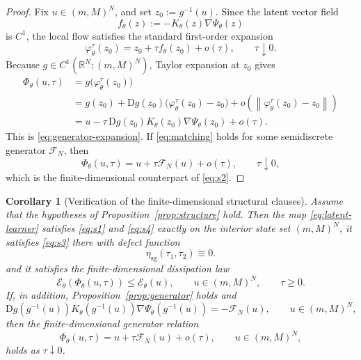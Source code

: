 \documentclass[11pt]{article}
\newtheorem{corollary}{Corollary}
\newcommand{\R}{\mathbb{R}}
\newcommand{\cE}{\mathcal{E}}
\newcommand{\cFN}{\mathcal{F}_N}
\newcommand{\PhiT}{\Phi_{\theta}}
\newcommand{\norm}[1]{\left\lVert #1 \right\rVert}
\begin{document}
\begin{proof}
Fix \(u\in (m,M)^N\), and set \(z_0:=g^{-1}(u)\). Since the latent vector field
\begin{equation*}
f_{\theta}(z):=-K_{\theta}(z)\nabla \Psi_{\theta}(z)
\end{equation*}
is \(C^1\), the local flow satisfies the standard first-order expansion
\begin{equation*}
\varphi_{\theta}^{\tau}(z_0)=z_0+\tau f_{\theta}(z_0)+o(\tau), \qquad \tau\downarrow 0.
\end{equation*}
Because \(g\in C^1(\R^N;(m,M)^N)\), Taylor expansion at \(z_0\) gives
\begin{align*}
\PhiT(u,\tau)
&=g\bigl(\varphi_{\theta}^{\tau}(z_0)\bigr) \\
&=g(z_0)+\mathrm{D}g(z_0)\bigl(\varphi_{\theta}^{\tau}(z_0)-z_0\bigr)+o\!\left(\norm{\varphi_{\theta}^{\tau}(z_0)-z_0}\right) \\
&=u-\tau\,\mathrm{D}g(z_0)K_{\theta}(z_0)\nabla\Psi_{\theta}(z_0)+o(\tau).
\end{align*}
This is \eqref{eq:generator-expansion}. If \eqref{eq:matching} holds for some semidiscrete generator \(\cFN\), then
\begin{equation*}
\PhiT(u,\tau)=u+\tau\cFN(u)+o(\tau), \qquad \tau\downarrow 0,
\end{equation*}
which is the finite-dimensional counterpart of \eqref{eq:s2}.
\end{proof}

\begin{corollary}[Verification of the finite-dimensional structural clauses]\label{cor:verification}
Assume that the hypotheses of Proposition~\ref{prop:structure} hold. Then the map \eqref{eq:latent-learner} satisfies \eqref{eq:s1} and \eqref{eq:s4} exactly on the interior state set \((m,M)^N\), it satisfies \eqref{eq:s3} there with defect function
\begin{equation}\label{eq:exact-defect}
\eta_{\mathrm{sg}}(\tau_1,\tau_2)\equiv 0.
\end{equation}
and it satisfies the finite-dimensional dissipation law
\begin{equation}\label{eq:exact-discrete-energy}
\cE_{\theta}(\PhiT(u,\tau))\le \cE_{\theta}(u), \qquad u\in (m,M)^N, \qquad \tau\ge 0.
\end{equation}
If, in addition, Proposition~\ref{prop:generator} holds and
\begin{equation}\label{eq:matching-exact}
\mathrm{D}g(g^{-1}(u))K_{\theta}(g^{-1}(u))\nabla \Psi_{\theta}(g^{-1}(u))=-\cFN(u), \qquad u\in (m,M)^N,
\end{equation}
then the finite-dimensional generator relation
\begin{equation}\label{eq:s2-finite}
\PhiT(u,\tau)=u+\tau\cFN(u)+o(\tau), \qquad u\in (m,M)^N,
\end{equation}
holds as \(\tau\downarrow 0\).
\end{corollary}
\end{document}
